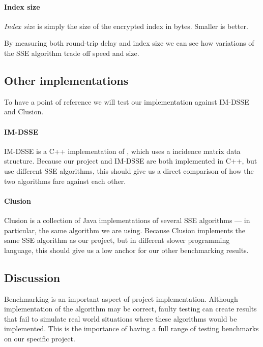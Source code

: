 \paragraph {Index size} \textit{Index size} is simply the size of the encrypted index in bytes. Smaller is better.

By measuring both round-trip delay and index size we can see how variations of the SSE algorithm trade off speed and size.


\subsection {Other implementations}

To have a point of reference we will test our implementation against IM-DSSE and Clusion.

\paragraph{IM-DSSE}
IM-DSSE \cite{im-dsse} is a C++ implementation of \cite{yavuz15}, which uses a incidence matrix data structure. Because our project and IM-DSSE are both implemented in C++, but use different SSE algorithms, this should give us a direct comparison of how the two algorithms fare against each other.

\paragraph{Clusion}
Clusion \cite{clusion} is a collection of Java implementations of several SSE algorithms --- in particular, the same algorithm we are using. Because Clusion implements the same SSE algorithm as our project, but in different slower programming language, this should give us a low anchor for our other benchmarking results.

\subsection {Discussion}

Benchmarking is an important aspect of project implementation.
Although implementation of the algorithm may be correct, faulty testing can create results that fail to simulate real world situations where these algorithms would be implemented.
This is the importance of having a full range of testing benchmarks on our specific project.

